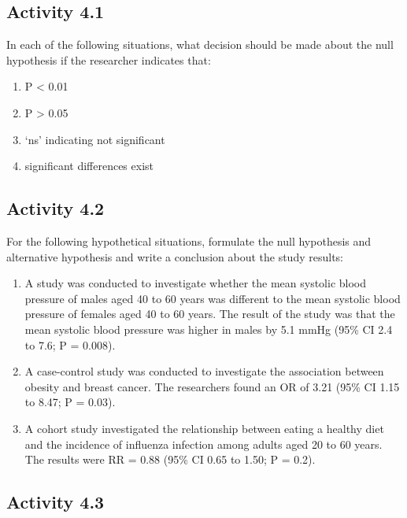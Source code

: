 \documentclass[
]{memoir}
\providecommand{\tightlist}{%
  \setlength{\itemsep}{0pt}\setlength{\parskip}{0pt}}
\begin{document}
\hypertarget{activity-4.1}{%
\subsection{Activity 4.1}\label{activity-4.1}}

In each of the following situations, what decision should be made about the null hypothesis if the researcher indicates that:

\begin{enumerate}
\def\labelenumi{\alph{enumi})}
\tightlist
\item
  P \textless{} 0.01
\item
  P \textgreater{} 0.05
\item
  `ns' indicating not significant
\item
  significant differences exist
\end{enumerate}

\hypertarget{activity-4.2}{%
\subsection{Activity 4.2}\label{activity-4.2}}

For the following hypothetical situations, formulate the null hypothesis and alternative hypothesis and write a conclusion about the study results:

\begin{enumerate}
\def\labelenumi{\alph{enumi})}
\tightlist
\item
  A study was conducted to investigate whether the mean systolic blood pressure of males aged 40 to 60 years was different to the mean systolic blood pressure of females aged 40 to 60 years. The result of the study was that the mean systolic blood pressure was higher in males by 5.1 mmHg (95\% CI 2.4 to 7.6; P = 0.008).
\item
  A case-control study was conducted to investigate the association between obesity and breast cancer. The researchers found an OR of 3.21 (95\% CI 1.15 to 8.47; P = 0.03).
\item
  A cohort study investigated the relationship between eating a healthy diet and the incidence of influenza infection among adults aged 20 to 60 years. The results were RR = 0.88 (95\% CI 0.65 to 1.50; P = 0.2).
\end{enumerate}

\hypertarget{activity-4.3}{%
\subsection{Activity 4.3}\label{activity-4.3}}
\end{document}
